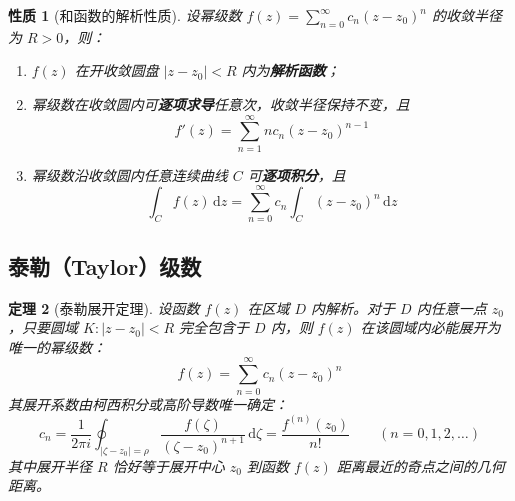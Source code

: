 \documentclass[11pt,a4paper,fontset=fandol]{ctexart}
\newtheorem{theorem}{定理}[section]
\newtheorem{property}[theorem]{性质}
\theoremstyle{remark}
\begin{document}
\begin{property}[和函数的解析性质]
设幂级数 $f(z) = \sum_{n=0}^\infty c_n (z - z_0)^n$ 的收敛半径为 $R > 0$，则：
\begin{enumerate}
    \item $f(z)$ 在开收敛圆盘 $|z - z_0| < R$ 内为\textbf{解析函数}；
    \item 幂级数在收敛圆内可\textbf{逐项求导}任意次，收敛半径保持不变，且
    \begin{equation}
        f'(z) = \sum_{n=1}^\infty n c_n (z - z_0)^{n-1}
    \end{equation}
    \item 幂级数沿收敛圆内任意连续曲线 $C$ 可\textbf{逐项积分}，且
    \begin{equation}
        \int_C f(z)\,\mathrm{d}z = \sum_{n=0}^\infty c_n \int_C (z - z_0)^n\,\mathrm{d}z
    \end{equation}
\end{enumerate}
\end{property}

\subsection{泰勒（Taylor）级数}

\begin{theorem}[泰勒展开定理]
设函数 $f(z)$ 在区域 $D$ 内解析。对于 $D$ 内任意一点 $z_0$，只要圆域 $K: |z - z_0| < R$ 完全包含于 $D$ 内，则 $f(z)$ 在该圆域内必能展开为唯一的幂级数：
\begin{equation}
    f(z) = \sum_{n=0}^\infty c_n (z - z_0)^n
\end{equation}
其展开系数由柯西积分或高阶导数唯一确定：
\begin{equation}
    c_n = \frac{1}{2\pi i} \oint_{|\zeta - z_0| = \rho} \frac{f(\zeta)}{(\zeta - z_0)^{n+1}}\,\mathrm{d}\zeta = \frac{f^{(n)}(z_0)}{n!} \qquad (n = 0, 1, 2, \dots)
\end{equation}
其中展开半径 $R$ 恰好等于展开中心 $z_0$ 到函数 $f(z)$ 距离最近的奇点之间的几何距离。
\end{theorem}
\end{document}
